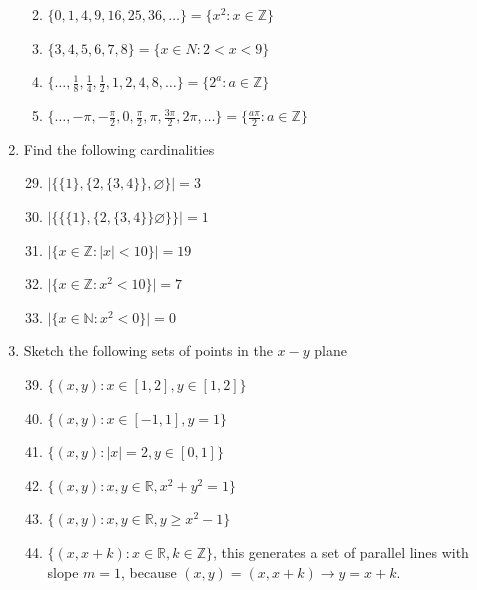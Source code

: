 \documentclass[10pt]{article}
\newcommand{\R}{\mathbb{R}}
\newcommand{\N}{\mathbb{N}}
\newcommand{\Z}{\mathbb{Z}}
\theoremstyle{definition}
\begin{document}
\begin{enumerate}[label=\Alph*.]
\begin{enumerate}[label=\arabic*.]
            \item $\{0,1,4,9,16,25,36,\dots\}=\{x^2 : x \in \Z \}$
            \item $\{3,4,5,6,7,8\} = \{x \in N: 2 < x < 9\}$
            \item $\{\dots,\frac{1}{8},\frac{1}{4},\frac{1}{2},1,2,4,8,\dots\} = \{2^a: a \in \Z\}$
            \item $\{\dots, -\pi,-\frac{\pi}{2},0,\frac{\pi}{2},\pi,\frac{3\pi}{2},2\pi,\dots\} = \{\frac{a\pi}{2}: a \in \Z \}$
        \end{enumerate}
    \item Find the following cardinalities
        \begin{enumerate}[label=\arabic*.]
                \setcounter{enumii}{28}
            \item $\left| \{\{1\}, \{2,\{3,4\}\},\varnothing\} \right| = 3$
            \item $\lvert \{\{\{1\},\{2,\{3,4\}\}\varnothing\}\} \rvert = 1 $
            \item $\lvert \{x \in \Z : |x| < 10\} \rvert = 19$
            \item $\lvert \{x \in \Z : x^2 < 10\} \rvert = 7$
            \item $\lvert \{x \in \N : x^2 < 0\} \rvert = 0$
        \end{enumerate}
    \item Sketch the following sets of points in the $x-y$ plane
        \begin{enumerate}[label=\arabic*.]
                \setcounter{enumii}{38}
            \item $\{(x,y) : x \in [1,2],y\in[1,2]\}$
            \item $\{(x,y):x\in[-1,1],y=1\}$
            \item $\{(x,y): |x|=2,y\in[0,1]\}$
            \item $\{(x,y):x,y\in\R,x^2+y^2=1\}$
            \item $\{(x,y):x,y\in\R,y\geq x^2-1\}$
            \item $\{(x,x+k):x\in\R,k\in\Z\}$, this generates a set of parallel lines with slope $m=1$, because $(x,y) = (x,x+k) \rightarrow y=x+k$.

\end{enumerate}
\end{enumerate}
\end{document}
